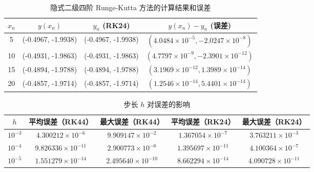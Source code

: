 \documentclass[a4paper]{article}
\begin{document}
\begin{table*}[ht]
	\centering
	\caption{隐式二级四阶 Runge-Kutta 方法的计算结果和误差}
	\label{error_24}
	\begin{tabular}{c|c|cc}
	\hline
	$x_n$ & $y(x_n)$           & $y_n$ (RK24)       & $y(x_n)-y_n $ (误差)                                \\ \hline
	5     & (-0.4967, -1.9938) & (-0.4967, -1.9938) & $(4.0484\times 10^{-5}, -2.0247\times 10^{-8})$  \\
	10    & (-0.4931, -1.9863) & (-0.4931, -1.9863) & $(4.7797\times 10^{-9}, -2.3901\times 10^{-12})$ \\
	15    & (-0.4894, -1.9788) & (-0.4894, -1.9788) & $(3.1969\times 10^{-12}, 1.3989\times 10^{-14})$ \\
	20    & (-0.4857, -1.9714) & (-0.4857, -1.9714) & $(1.2546\times 10^{-14}, 5.4401\times 10^{-14})$ \\ \hline
	\end{tabular}
\end{table*}

\begin{table*}[ht]
	\centering
	\caption{步长 $h$ 对误差的影响}
	\label{error_h}
	\begin{tabular}{c|cc|cc}
	\hline
	$h$       & 平均误差（RK44）                & 最大误差（RK44）                & 平均误差（RK24）                & 最大误差（RK24）                \\ \hline
	$10^{-3}$ & $4.300212\times 10^{-6}$  & $9.909147\times 10^{-2}$  & $1.367054\times 10^{-7}$  & $3.763211\times 10^{-3}$  \\
	$10^{-4}$ & $9.826336\times 10^{-11}$ & $2.900773\times 10^{-6}$  & $1.395697\times 10^{-11}$ & $4.100364\times 10^{-7}$  \\
	$10^{-5}$ & $1.551279\times 10^{-14}$ & $2.495640\times 10^{-10}$ & $8.662294\times 10^{-14}$ & $4.090728\times 10^{-11}$ \\ \hline
	\end{tabular}
\end{table*}

%
%

\end{document}
